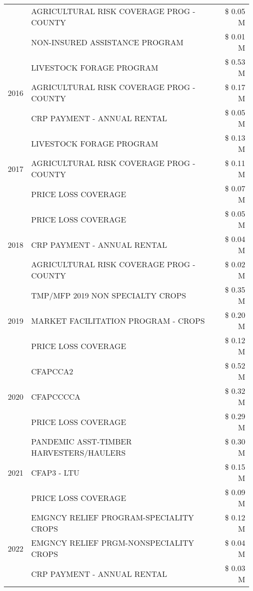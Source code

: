 \begin{tabular}{llr}
 & AGRICULTURAL RISK COVERAGE PROG - COUNTY & \$ 0.05 M \\
 & NON-INSURED ASSISTANCE PROGRAM & \$ 0.01 M \\
\cline{1-3}
\multirow[t]{3}{*}{2016} & LIVESTOCK FORAGE PROGRAM & \$ 0.53 M \\
 & AGRICULTURAL RISK COVERAGE PROG - COUNTY & \$ 0.17 M \\
 & CRP PAYMENT - ANNUAL RENTAL & \$ 0.05 M \\
\cline{1-3}
\multirow[t]{3}{*}{2017} & LIVESTOCK FORAGE PROGRAM & \$ 0.13 M \\
 & AGRICULTURAL RISK COVERAGE PROG - COUNTY & \$ 0.11 M \\
 & PRICE LOSS COVERAGE & \$ 0.07 M \\
\cline{1-3}
\multirow[t]{3}{*}{2018} & PRICE LOSS COVERAGE & \$ 0.05 M \\
 & CRP PAYMENT - ANNUAL RENTAL & \$ 0.04 M \\
 & AGRICULTURAL RISK COVERAGE PROG - COUNTY & \$ 0.02 M \\
\cline{1-3}
\multirow[t]{3}{*}{2019} & TMP/MFP 2019 NON SPECIALTY CROPS & \$ 0.35 M \\
 & MARKET FACILITATION PROGRAM - CROPS & \$ 0.20 M \\
 & PRICE LOSS COVERAGE & \$ 0.12 M \\
\cline{1-3}
\multirow[t]{3}{*}{2020} & CFAPCCA2 & \$ 0.52 M \\
 & CFAPCCCCA & \$ 0.32 M \\
 & PRICE LOSS COVERAGE & \$ 0.29 M \\
\cline{1-3}
\multirow[t]{3}{*}{2021} & PANDEMIC ASST-TIMBER HARVESTERS/HAULERS & \$ 0.30 M \\
 & CFAP3 - LTU & \$ 0.15 M \\
 & PRICE LOSS COVERAGE & \$ 0.09 M \\
\cline{1-3}
\multirow[t]{3}{*}{2022} & EMGNCY RELIEF PROGRAM-SPECIALITY CROPS & \$ 0.12 M \\
 & EMGNCY RELIEF PRGM-NONSPECIALITY CROPS & \$ 0.04 M \\
 & CRP PAYMENT - ANNUAL RENTAL & \$ 0.03 M \\
\cline{1-3}
\bottomrule
\end{tabular}
